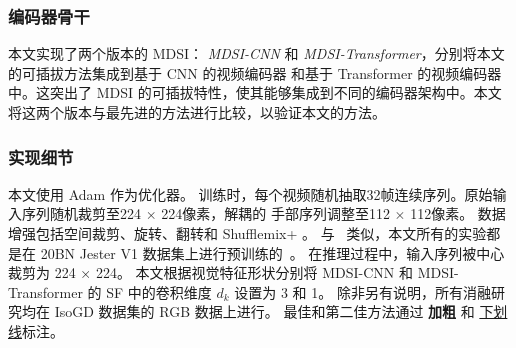 


\subsubsection{编码器骨干}
\label{sec:encoder_backbone}
本文实现了两个版本的 MDSI： \emph{MDSI-CNN} 和 \emph{MDSI-Transformer}，分别将本文的可插拔方法集成到基于 CNN 的视频编码器 \cite{zhu2018continuous} 和基于 Transformer 的视频编码器 \cite{zhou2022decoupling} 中。这突出了 MDSI 的可插拔特性，使其能够集成到不同的编码器架构中。本文将这两个版本与最先进的方法进行比较，以验证本文的方法。

\subsubsection{实现细节}
\label{sec:implementation}
本文使用 Adam 作为优化器。
训练时，每个视频随机抽取32帧连续序列。原始输入序列随机裁剪至224 $\times$ 224像素，解耦的
手部序列调整至112 $\times$ 112像素。
数据增强包括空间裁剪、旋转、翻转和 Shufflemix+ \cite{zhou2023unified}。
与~\cite{yu2021searching,zhou2021regional,zhou2022decoupling,zhou2023unified} 类似，本文所有的实验都是在 20BN Jester V1 数据集上进行预训练的~\cite{materzynska2019jester}。
在推理过程中，输入序列被中心裁剪为 224 × 224。
本文根据视觉特征形状分别将 MDSI-CNN 和 MDSI-Transformer 的 SF 中的卷积维度 $d_k$ 设置为 3 和 1。
除非另有说明，所有消融研究均在 IsoGD 数据集的 RGB 数据上进行。
最佳和第二佳方法通过 \textbf{加粗} 和 \underline{下划线}标注。

